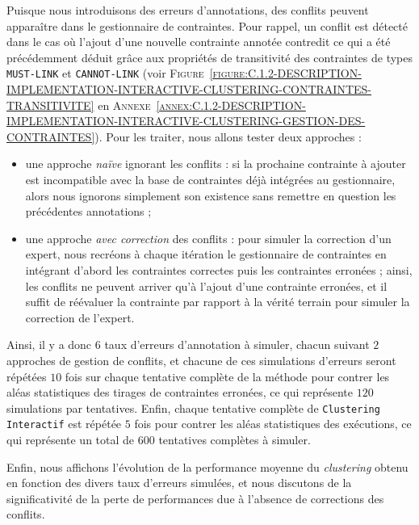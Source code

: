 			Puisque nous introduisons des erreurs d'annotations, des conflits peuvent apparaître dans le gestionnaire de contraintes.
			Pour rappel, un conflit est détecté dans le cas où l'ajout d'une nouvelle contrainte annotée contredit ce qui a été précédemment déduit grâce aux propriétés de transitivité des contraintes de types \texttt{MUST-LINK} et \texttt{CANNOT-LINK} (voir \textsc{Figure~\ref{figure:C.1.2-DESCRIPTION-IMPLEMENTATION-INTERACTIVE-CLUSTERING-CONTRAINTES-TRANSITIVITE}} en \textsc{Annexe~\ref{annex:C.1.2-DESCRIPTION-IMPLEMENTATION-INTERACTIVE-CLUSTERING-GESTION-DES-CONTRAINTES}}).
			Pour les traiter, nous allons tester deux approches :
			\begin{itemize}
				\item une approche \textit{naïve} ignorant les conflits : si la prochaine contrainte à ajouter est incompatible avec la base de contraintes déjà intégrées au gestionnaire, alors nous ignorons simplement son existence sans remettre en question les précédentes annotations ;
				\item une approche \textit{avec correction} des conflits : pour simuler la correction d'un expert, nous recréons à chaque itération le gestionnaire de contraintes en intégrant d'abord les contraintes correctes puis les contraintes erronées ; ainsi, les conflits ne peuvent arriver qu'à l'ajout d'une contrainte erronées, et il suffit de réévaluer la contrainte par rapport à la vérité terrain pour simuler la correction de l'expert.
			\end{itemize}
			
			Ainsi, il y a donc $6$ taux d'erreurs d'annotation à simuler, chacun suivant $2$ approches de gestion de conflits, et chacune de ces simulations d'erreurs seront répétées $10$ fois sur chaque tentative complète de la méthode pour contrer les aléas statistiques des tirages de contraintes erronées, ce qui représente $120$ simulations par tentatives.
			Enfin, chaque tentative complète de \texttt{Clustering Interactif} est répétée $5$ fois pour contrer les aléas statistiques des exécutions, ce qui représente un total de $600$ tentatives complètes à simuler.

			Enfin, nous affichons l'évolution de la performance moyenne du \textit{clustering} obtenu en fonction des divers taux d'erreurs simulées, et nous discutons de la significativité de la perte de performances due à l'absence de corrections des conflits.
			
